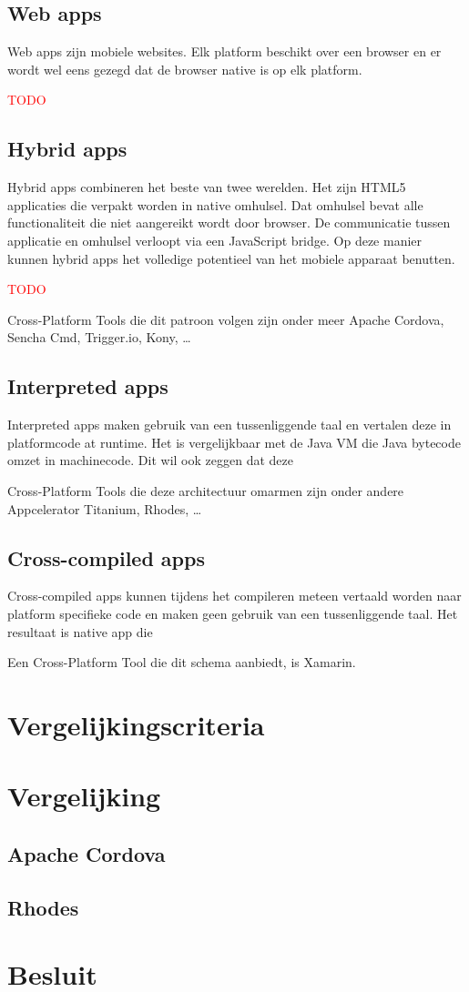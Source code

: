 \documentclass[a4paper,conference]{IEEEconf}
\newcommand{\TODO}{\textcolor{red}{TODO}}
\begin{document}
\subsection{Web apps}

Web apps zijn mobiele websites. Elk platform beschikt over een browser en er wordt wel eens gezegd dat de browser native is op elk platform. 

\TODO

\subsection{Hybrid apps}

Hybrid apps combineren het beste van twee werelden. Het zijn HTML5 applicaties die verpakt worden in native omhulsel. Dat omhulsel bevat alle functionaliteit die niet aangereikt wordt door browser. De communicatie tussen applicatie en omhulsel verloopt via een JavaScript bridge. Op deze manier kunnen hybrid apps het volledige potentieel van het mobiele apparaat benutten.

\TODO

Cross-Platform Tools die dit patroon volgen zijn onder meer Apache Cordova, Sencha Cmd, Trigger.io, Kony, \ldots

\subsection{Interpreted apps}

Interpreted apps maken gebruik van een tussenliggende taal en vertalen deze in platformcode at runtime. Het is vergelijkbaar met de Java VM die Java bytecode omzet in machinecode. Dit wil ook zeggen dat deze  

Cross-Platform Tools die deze architectuur omarmen zijn onder andere Appcelerator Titanium, Rhodes, \ldots

\subsection{Cross-compiled apps}

Cross-compiled apps kunnen tijdens het compileren meteen vertaald worden naar platform specifieke code en maken geen gebruik van een tussenliggende taal. Het resultaat is native app die

Een Cross-Platform Tool die dit schema aanbiedt, is Xamarin.

\section{Vergelijkingscriteria}

\section{Vergelijking}

\subsection{Apache Cordova}

\subsection{Rhodes}

\section{Besluit}

\printbibliography
\end{document}
